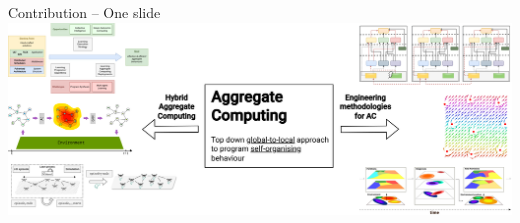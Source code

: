 \documentclass[presentation, 8pt,169]{beamer}\mode<presentation>{\usetheme{AMSBolognaFC}}
\begin{document}
\begin{frame}{Contribution -- One slide}
\\[0.5cm]

\includegraphics[width=\textwidth]{img/contribution.drawio.png}
\end{frame}
\end{document}
